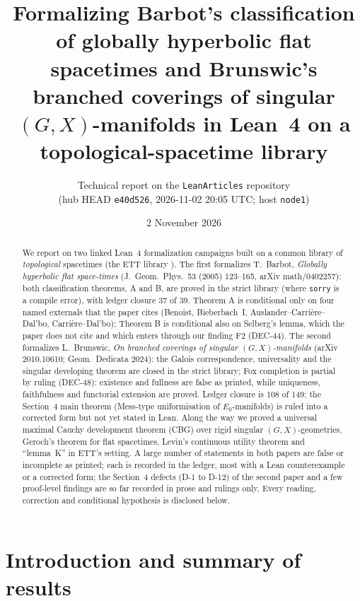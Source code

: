 \documentclass[11pt,a4paper]{article}
\title{Formalizing Barbot's classification of globally hyperbolic flat spacetimes
and Brunswic's branched coverings of singular $(G,X)$-manifolds in Lean~4
on a topological-spacetime library}
\author{Technical report on the \texttt{LeanArticles} repository\\
\small (hub HEAD \texttt{e40d526}, 2026-11-02 20:05 UTC; host \texttt{node1})}
\date{2 November 2026}
\newcommand{\lean}[1]{\texttt{\directlua{leanname("\luaescapestring{\detokenize{#1}}")}}}
\newcommand{\dec}[1]{DEC-#1}
\theoremstyle{plain}
\theoremstyle{definition}
\theoremstyle{remark}
\begin{document}
\maketitle

\begin{abstract}
We report on two linked Lean~4 formalization campaigns built on a common library of
\emph{topological} spacetimes (the ETT library \lean{Causal}). The first formalizes
T.~Barbot, \emph{Globally hyperbolic flat space-times} (J.\ Geom.\ Phys.\ 53 (2005)
123--165, arXiv math/0402257): both classification theorems, A and B, are proved in the
strict library (where \texttt{sorry} is a compile error), with ledger closure 37 of 39.
Theorem A is conditional only on four named externals that the paper cites (Benoist,
Bieberbach~I, Auslander--Carrière--Dal'bo, Carrière--Dal'bo); Theorem B is conditional
also on Selberg's lemma, which the paper does not cite and which enters through our
finding F2 (\dec{44}). The second
formalizes L.~Brunswic, \emph{On branched coverings of singular $(G,X)$-manifolds}
(arXiv 2010.10610; Geom.\ Dedicata 2024): the Galois correspondence, universality and
the singular developing theorem are closed in the strict library; Fox completion is partial
by ruling (\dec{48}): existence and fullness are false as printed, while uniqueness,
faithfulness and functorial extension are proved. Ledger closure is 108 of 149; the Section~4 main theorem (Mess-type uniformisation of
$E_0$-manifolds) is ruled into a corrected form but not yet stated in Lean. Along the way
we proved a universal maximal Cauchy development theorem (CBG) over rigid singular
$(G,X)$-geometries, Geroch's theorem for flat spacetimes, Levin's continuous
utility theorem and ``lemma~K'' in ETT's setting. A large number of statements in both
papers are false or incomplete as printed; each is recorded in the ledger, most with a
Lean counterexample or a corrected form; the Section~4 defects (D-1 to D-12) of the
second paper and a few proof-level findings are so far recorded in prose and rulings only. Every reading, correction and conditional hypothesis is disclosed
below.
\end{abstract}

\tableofcontents

\section{Introduction and summary of results}
\end{document}

